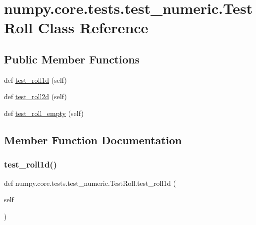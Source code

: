 \hypertarget{classnumpy_1_1core_1_1tests_1_1test__numeric_1_1TestRoll}{}\section{numpy.\+core.\+tests.\+test\+\_\+numeric.\+Test\+Roll Class Reference}
\label{classnumpy_1_1core_1_1tests_1_1test__numeric_1_1TestRoll}
\subsection*{Public Member Functions}
\begin{DoxyCompactItemize}
\item 
def \hyperlink{classnumpy_1_1core_1_1tests_1_1test__numeric_1_1TestRoll_a1f2aa944adae2dbde4aeea5ddd218fa1}{test\+\_\+roll1d} (self)
\item 
def \hyperlink{classnumpy_1_1core_1_1tests_1_1test__numeric_1_1TestRoll_a6426541c557d63adbd1c1efa490eb14c}{test\+\_\+roll2d} (self)
\item 
def \hyperlink{classnumpy_1_1core_1_1tests_1_1test__numeric_1_1TestRoll_a099dc9da93ef324605fdbae7d5ea9ba0}{test\+\_\+roll\+\_\+empty} (self)
\end{DoxyCompactItemize}


\subsection{Member Function Documentation}
\mbox{\label{classnumpy_1_1core_1_1tests_1_1test__numeric_1_1TestRoll_a1f2aa944adae2dbde4aeea5ddd218fa1}} 
\subsubsection{\texorpdfstring{test\+\_\+roll1d()}{test\_roll1d()}}
{\footnotesize\ttfamily def numpy.\+core.\+tests.\+test\+\_\+numeric.\+Test\+Roll.\+test\+\_\+roll1d (\begin{DoxyParamCaption}\item[{}]{self }\end{DoxyParamCaption})}

